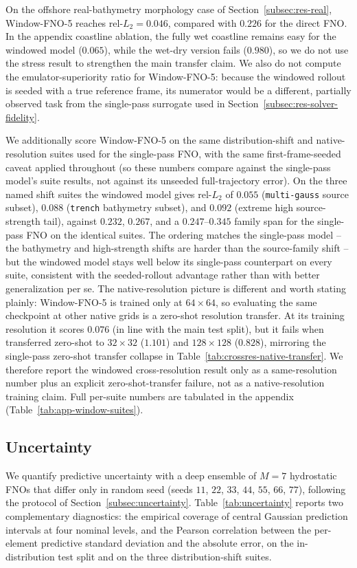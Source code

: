 On the offshore real-bathymetry morphology case of Section~\ref{subsec:res-real}, Window-FNO-5 reaches rel-$L_2=0.046$, compared with $0.226$ for the direct FNO. In the appendix coastline ablation, the fully wet coastline remains easy for the windowed model ($0.065$), while the wet-dry version fails ($0.980$), so we do not use the stress result to strengthen the main transfer claim. We also do not compute the emulator-superiority ratio for Window-FNO-5: because the windowed rollout is seeded with a true reference frame, its numerator would be a different, partially observed task from the single-pass surrogate used in Section~\ref{subsec:res-solver-fidelity}.

We additionally score Window-FNO-5 on the same distribution-shift and native-resolution suites used for the single-pass FNO, with the same first-frame-seeded caveat applied throughout (so these numbers compare against the single-pass model's suite results, not against its unseeded full-trajectory error). On the three named shift suites the windowed model gives rel-$L_2$ of $0.055$ (\texttt{multi-gauss} source subset), $0.088$ (\texttt{trench} bathymetry subset), and $0.092$ (extreme high source-strength tail), against $0.232$, $0.267$, and a $0.247$--$0.345$ family span for the single-pass FNO on the identical suites. The ordering matches the single-pass model -- the bathymetry and high-strength shifts are harder than the source-family shift -- but the windowed model stays well below its single-pass counterpart on every suite, consistent with the seeded-rollout advantage rather than with better generalization per se. The native-resolution picture is different and worth stating plainly: Window-FNO-5 is trained only at $64 \times 64$, so evaluating the same checkpoint at other native grids is a zero-shot resolution transfer. At its training resolution it scores $0.076$ (in line with the main test split), but it fails when transferred zero-shot to $32 \times 32$ ($1.101$) and $128 \times 128$ ($0.828$), mirroring the single-pass zero-shot transfer collapse in Table~\ref{tab:crossres-native-transfer}. We therefore report the windowed cross-resolution result only as a same-resolution number plus an explicit zero-shot-transfer failure, not as a native-resolution training claim. Full per-suite numbers are tabulated in the appendix (Table~\ref{tab:app-window-suites}).

\subsection{Uncertainty}
\label{subsec:res-uncertainty}
We quantify predictive uncertainty with a deep ensemble of $M = 7$ hydrostatic FNOs that differ only in random seed (seeds $11$, $22$, $33$, $44$, $55$, $66$, $77$), following the protocol of Section~\ref{subsec:uncertainty}. Table~\ref{tab:uncertainty} reports two complementary diagnostics: the empirical coverage of central Gaussian prediction intervals at four nominal levels, and the Pearson correlation between the per-element predictive standard deviation and the absolute error, on the in-distribution test split and on the three distribution-shift suites.

